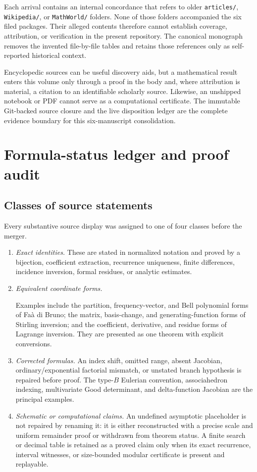 \documentclass[11pt,a4paper,oneside,openany]{book}
\theoremstyle{definition}
\theoremstyle{remark}
\begin{document}
Each arrival contains an internal concordance that refers to older
\nolinkurl{articles/}, \nolinkurl{Wikipedia/}, or \nolinkurl{MathWorld/}
folders.  None of those folders accompanied the six filed packages.  Their alleged
contents therefore cannot establish coverage, attribution, or verification in the
present repository.  The canonical monograph removes the invented file-by-file
tables and retains those references only as self-reported historical context.

Encyclopedic sources can be useful discovery aids, but a mathematical result enters
this volume only through a proof in the body and, where attribution is material, a
citation to an identifiable scholarly source.  Likewise, an unshipped notebook or
PDF cannot serve as a computational certificate.  The immutable Git-backed source
closure and the live disposition ledger are the complete evidence boundary for this
six-manuscript consolidation.

\chapter{Formula-status ledger and proof audit}
\label{ch:merged-proof-audit}

\section{Classes of source statements}
Every substantive source display was assigned to one of four classes before the
merger.
\begin{enumerate}
\item \emph{Exact identities.}  These are stated in normalized notation and proved
      by a bijection, coefficient extraction, recurrence uniqueness, finite
      differences, incidence inversion, formal residues, or analytic estimates.
\item \emph{Equivalent coordinate forms.}\par
      Examples include the partition, frequency-vector, and Bell polynomial forms
      of Fa\`a di Bruno; the matrix,
      basis-change, and generating-function forms of Stirling inversion; and the
      coefficient, derivative, and residue forms of Lagrange inversion.  They are
      presented as one theorem with explicit conversions.
\item \emph{Corrected formulas.}  An index shift, omitted range, absent Jacobian,
      ordinary/exponential factorial mismatch, or unstated branch hypothesis is
      repaired before proof.  The type-$B$ Eulerian convention, associahedron
      indexing, multivariate Good determinant, and delta-function Jacobian are the
      principal examples.
\item \emph{Schematic or computational claims.}  An undefined asymptotic
      placeholder is not repaired by renaming it: it is either reconstructed with
      a precise scale and uniform remainder proof or withdrawn from theorem status.
      A finite search or decimal table is retained as a proved claim only when its
      exact recurrence, interval witnesses, or size-bounded modular certificate is
      present and replayable.
\end{enumerate}
\end{document}
